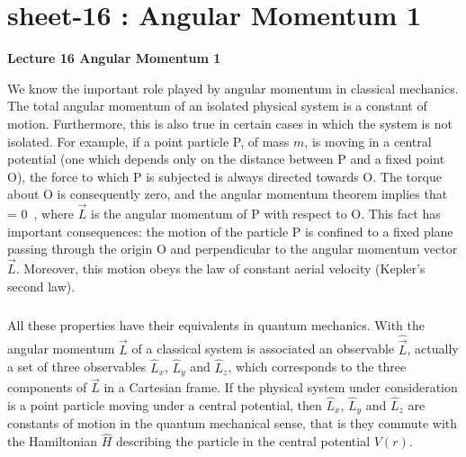 
\chapter{sheet-16 : Angular Momentum 1}


\ifpdf
\graphicspath{{Chapter16/figs/}}
\else
\graphicspath{{Chapter16/figs/}}
\fi


\setcounter{chapter}{16}
\noindent
\begin{Large}
	{\bf Lecture 16 \newline
		Angular Momentum 1}
\end{Large}


\vspace{5 mm}
We know the important role played by angular momentum in classical mechanics. The total angular momentum of an  
isolated physical system is a constant of motion. Furthermore, this is also true in certain cases in which the system
is not isolated. For example, if a point particle P, of mass $m$, is moving in a central potential (one which depends only on 
the distance between P and a fixed point O), the force to which P is subjected is always directed towards O. The torque about O is 
consequently zero, and the angular momentum theorem implies that
\be
{} = 0 \,,
\ee
where $\vec{L}$ is the angular momentum of P with respect to O. This fact has important consequences: the motion of the
particle P is confined to a fixed plane passing through the origin O and perpendicular to the angular momentum
vector $\vec{L}$. Moreover, this motion obeys the law of constant aerial velocity (Kepler's second law).

\paragraph{}
All these properties have their equivalents in quantum mechanics. With the angular momentum $\vec{L}$ of a 
classical system is associated an observable $\hat{\vec{L}}$, actually a set of three observables $\hat{L}_x$,
$\hat{L}_y$ and $\hat{L}_z$, which corresponds to the three components of $\vec{L}$ in a Cartesian frame.  If the
physical system under consideration is a point particle moving under a central potential, then $\hat{L}_x$,
$\hat{L}_y$ and $\hat{L}_z$ are constants of motion in the quantum mechanical sense, that is they commute with
the Hamiltonian $\hat{H}$ describing the particle in the central potential $V(r)$.

